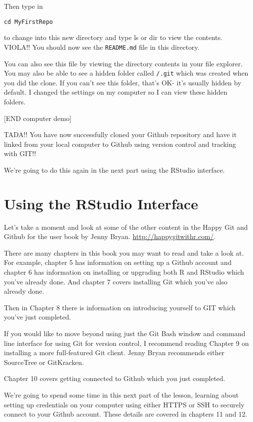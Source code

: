 \documentclass[
]{book}
\begin{document}
Then type in

\texttt{cd\ MyFirstRepo}

to change into this new directory and type ls or dir to view the contents. VIOLA!! You should now see the \texttt{README.md} file in this directory.

You can also see this file by viewing the directory contents in your file explorer. You may also be able to see a hidden folder called \texttt{/.git} which was created when you did the clone. If you can't see this folder, that's OK- it's usually hidden by default. I changed the settings on my computer so I can view these hidden folders.

{[}END computer demo{]}

TADA!! You have now successfully cloned your Github repository and have it linked from your local computer to Github using version control and tracking with GIT!!

We're going to do this again in the next part using the RStudio interface.

\hypertarget{using-the-rstudio-interface}{%
\section{Using the RStudio Interface}\label{using-the-rstudio-interface}}

Let's take a moment and look at some of the other content in the Happy Git and Github for the user book by Jenny Bryan. \url{http://happygitwithr.com/}.

There are many chapters in this book you may want to read and take a look at. For example, chapter 5 has information on setting up a Github account and chapter 6 has information on installing or upgrading both R and RStudio which you've already done. And chapter 7 covers installing Git which you've also already done.

Then in Chapter 8 there is information on introducing yourself to GIT which you've just completed.

If you would like to move beyond using just the Git Bash window and command line interface for using Git for version control, I recommend reading Chapter 9 on installing a more full-featured Git client. Jenny Bryan recommends either SourceTree or GitKracken.

Chapter 10 covers getting connected to Github which you just completed.

We're going to spend some time in this next part of the lesson, learning about setting up credentials on your computer using either HTTPS or SSH to securely connect to your Github account. These details are covered in chapters 11 and 12.
\end{document}
